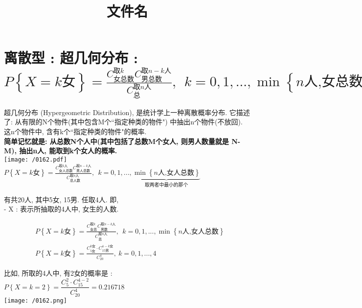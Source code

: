 \documentclass[UTF8]{ctexart}
\title{文件名}
\begin{document}
	\tableofcontents %
	\date{} %
	\maketitle  %
	
	
	
	\section{离散型 : 超几何分布 : \\ $\boxed{
			P\left\{ X=k\text{女} \right\} =\frac{C_{\text{女总数}}^{\text{取}k}C_{\text{男总数}}^{\text{取}n-k\text{人}}}{C_{\text{总}}^{\text{取}n\text{人}}},\ \ k=0,1,...,\min \left\{ n\text{人,女总数} \right\} 
			}$}
	
	超几何分布  (Hypergeometric Distribution), 是统计学上一种离散概率分布. 它描述了: 从有限的N个物件(其中包含M个``指定种类的物件") 中抽出n个物件(不放回). 这n个物件中, 含有k个``指定种类的物件"的概率. \\	
	
	\textbf{简单记忆就是: 从总数N个人中(其中包括了总数M个女人, 则男人数量就是 N-M), 抽出n人, 能取到k个女人的概率.} \\
	
	\texttt{[image: /0162.pdf]} \\
	
	$\boxed{
	P\left\{ X=k\text{女} \right\} =\frac{C_{\text{女人总数}}^{\text{取}k\text{人}}C_{\text{男人总数}}^{\text{取}n-k\text{人}}}{C_{\text{总人数}}^{\text{取}n\text{人}}},\ \ k=0,1,...,\underset{\text{取两者中最小的那个}}{\underbrace{\min \left\{ n\text{人,女人总数} \right\} }}
	}$ \\
	\vspace{1em} 
	
	\begin{myEnvSample}
		有共20人, 其中5女, 15男. 任取4人. 即,  \\
		- X : 表示所抽取的4人中, 女生的人数. 
						
		\begin{align*}  %
	&P\left\{ X=k\text{女} \right\} =\frac{C_{\text{女总}}^{\text{取}k}C_{\text{男数}}^{\text{取}n-k\text{人}}}{C_{\text{总}}^{\text{取}n\text{人}}},\ \ k=0,1,...,\min \left\{ n\text{人,女人总数} \right\}\\
&P\left\{ X=k\text{女} \right\} =\frac{C_{5\text{女}}^{k\text{女}}\cdot C_{15\text{男}}^{4-k\text{女}}}{C_{20}^{4}},\ k=0,1,...,4
		\end{align*}
	
	比如, 所取的4人中, 有2女的概率是 : \\
	$	P\left\{ X=k=2 \right\} =\dfrac{C_{5}^{2}\cdot C_{15}^{4-2}}{C_{20}^{4}}=0.216718	$ \\
	
	\texttt{[image: /0162.png]}	
	\end{myEnvSample}
	
	
	
	
\end{document}
